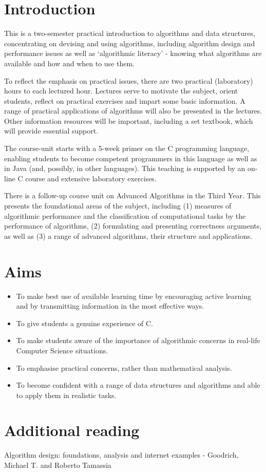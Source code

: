 \section*{Introduction}

This is a two-semester practical introduction to algorithms and data structures,
concentrating on devising and using algorithms, including algorithm design and
performance issues as well as `algorithmic literacy' - knowing what algorithms
are available and how and when to use them.

To reflect the emphasis on practical issues, there are two practical
(laboratory) hours to each lectured hour. Lectures serve to motivate the
subject, orient students, reflect on practical exercises and impart some basic
information. A range of practical applications of algorithms will also be
presented in the lectures. Other information resources will be important,
including a set textbook, which will provide essential support.

The course-unit starts with a 5-week primer on the C programming language,
enabling students to become competent programmers in this language as well as in
Java (and, possibly, in other languages). This teaching is supported by an on-
line C course and extensive laboratory exercises.

There is a follow-up course unit on Advanced Algorithms in the Third Year. This
presents the foundational areas of the subject, including (1) measures of
algorithmic performance and the classification of computational tasks by the
performance of algorithms, (2) formulating and presenting correctness arguments,
as well as (3) a range of advanced algorithms, their structure and applications.

\section*{Aims}

\begin{itemize}
\item To make best use of available learning time by encouraging active learning
      and by transmitting information in the most effective ways.
\item To give students a genuine experience of C.
\item To make students aware of the importance of algorithmic concerns in
      real-life Computer Science situations.
\item To emphasise practical concerns, rather than mathematical analysis.
\item To become confident with a range of data structures and algorithms and
      able to apply them in realistic tasks.
\end{itemize}

\section*{Additional reading}

Algorithm design: foundations, analysis and internet examples - Goodrich,
Michael T. and Roberto Tamassia